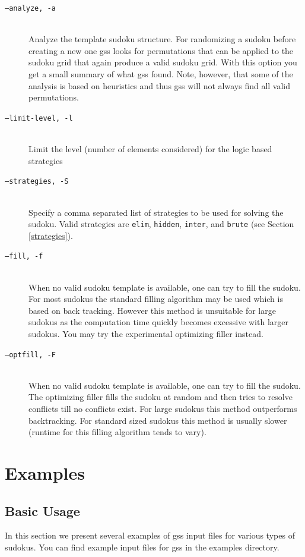 \documentclass[12pt]{article}
\begin{document}
\begin{description}
\item [\texttt{--analyze, -a}] \hfill \\ Analyze the template sudoku structure. For randomizing a sudoku before creating a new one gss looks for permutations that can be applied to the sudoku grid that again produce a valid sudoku grid. With this option you get a small summary of what gss found. Note, however, that some of the analysis is based on heuristics and thus gss will not always find all valid permutations.
\item [\texttt{--limit-level, -l}] \hfill \\ Limit the level (number of elements considered) for the logic based strategies
\item [\texttt{--strategies, -S}] \hfill \\ Specify a comma separated list of strategies to be used for solving the sudoku. Valid strategies are \texttt{elim}, \texttt{hidden}, \texttt{inter}, and \texttt{brute} (see Section \ref{strategies}). 
\item [\texttt{--fill, -f}] \hfill \\ When no valid sudoku template is available, one can try to fill the sudoku. For most sudokus the standard filling algorithm may be used which is based on back tracking. However this method is unsuitable for large sudokus as the computation time quickly becomes excessive with larger sudokus. You may try the experimental optimizing filler instead.
\item [\texttt{--optfill, -F}] \hfill \\ When no valid sudoku template is available, one can try to fill the sudoku. The optimizing filler fills the sudoku at random and then tries to resolve conflicts till no conflicts exist. For large sudokus this method outperforms backtracking. For standard sized sudokus this method is usually slower (runtime for this filling algorithm tends to vary).
\end{description}

\section{\label{examples}Examples}
\subsection{Basic Usage}
In this section we present several examples of gss input files for various types of sudokus. You can find example input files for gss in the examples directory.
\end{document}

